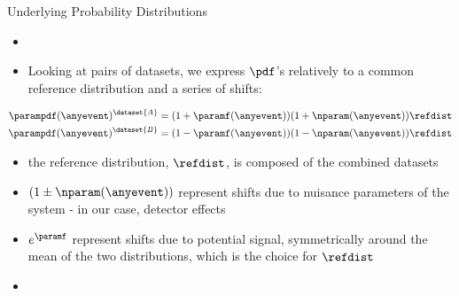 \documentclass[notheorems]{beamer}
\begin{document}
\begin{frame}{Underlying Probability Distributions}
    \begin{itemize}
        \item {}
        \item Looking at pairs of datasets, we express $\pdf$'s relatively to a common reference distribution and a series of shifts:
    \end{itemize}
    \begin{equation}
    \begin{aligned}
        \label{eq:parametrized_distribution}
        \parampdf(\anyevent)^\dataset{A} = (1 + \paramf(\anyevent))(1 + \nparam(\anyevent)) \refdist \\
        \parampdf(\anyevent)^\dataset{B} = (1 - \paramf(\anyevent))(1 - \nparam(\anyevent)) \refdist
    \end{aligned}
    \end{equation}
    \begin{itemize}
        \item the reference distribution, $\refdist$, is composed of the combined datasets
        \item $(1 \pm \nparam(\anyevent))$ represent shifts due to nuisance parameters of the system - in our case, detector effects
        \item $e^{\paramf}$ represent shifts due to potential signal, symmetrically around the mean of the two distributions, which is the choice for $\refdist$
        \item {}
    \end{itemize}
\end{frame}
\end{document}
